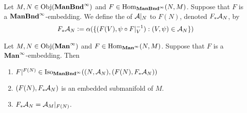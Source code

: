 \documentclass{book}
\begin{document}
	\begin{defn} 
		Let $M, N \in \Obj(\bManBndinf)$ and $F \in \Hom_{\bManBndinf}(N, M)$. Suppose that $F$ is a  $\bManBndinf$-embedding. We define the  of $\MA|_N$ to $F(N)$, denoted $F_*\MA_N$, by 
		$$F_*\MA_N \defeq \al (\{(F(V), \psi \circ F|_V^{-1}): (V, \psi) \in \MA_N\})$$
	\end{defn}

	\begin{ex} 
		Let $M, N \in \Obj(\bManinf)$ and  $F \in \Hom_{\bManinf}(N, M)$. Suppose that $F$ is a  $\bManinf$-embedding. Then
		\begin{enumerate}
			\item $F|^{F(N)} \in \Iso_{\bManBndinf}((N, \MA_N), (F(N), F_*\MA_N))$
			\item $(F(N), F_*\MA_N)$ is an embedded submanifold of $M$. 
			\item $F_*\MA_N = \MA_M|_{F(N)}$.
		\end{enumerate}
	\end{ex}
	
\end{document}
